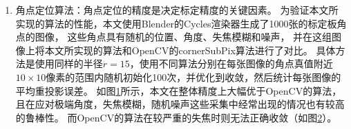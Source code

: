 \begin{enumerate}
\begin{figure}
    \centering
    {corner_fit.pgf}
    \small
    (a) 不同标定板角度下的精度对比\hfill
    (b) 不同失焦模糊下的精度对比\hfill
    (c) 不同噪音下的精度对比
    \caption[OpenCV与本文使用的角点定位算法的精度对比]{
        OpenCV与本文使用的角点定位算法的精度对比。
        带有噪音的图像服从柏松分布，
        增益表示在传感器取得最大读数时接收的电子数量，增益越高，噪声越小。
        在Blender渲染的全部1000张图像中，
        (a)展示了增益$2^{14}$时距离焦平面-0.3至0.2米的图像中，误差与标定版角度的关系；
        (b)展示了增益$2^{14}$时倾斜角度70°以下的图像中，误差与失焦模糊程度的关系；
        (c)展示了距离焦平面-0.3至0.2米且倾斜角度70°以下的图像中，误差与噪音强度的关系。
    }
    \label{fig:corner_fit}
\end{figure}

\begin{figure}
    \centering
    \begin{subfigure}{1.57in}
        {corner_gain-14_0023_opencv.pgf}%
        \caption{OpenCV, 增益$2^{14}$}%
    \end{subfigure}%
    \begin{subfigure}{1.57in}
        {corner_gain-10_0023_opencv.pgf}%
        \caption{OpenCV, 增益$2^{10}$}%
    \end{subfigure}%
    \begin{subfigure}{1.57in}
        {corner_gain-14_0023_saddle.pgf}%
        \caption{本文, 增益$2^{14}$}%
    \end{subfigure}%
    \begin{subfigure}{1.57in}
        {corner_gain-10_0023_saddle.pgf}%
        \caption{本文, 增益$2^{10}$}%
    \end{subfigure}%
    \caption[较严重失焦时的角点定位结果]{
        较严重失焦时的角点定位结果。
        左边两幅图展示了OpenCV的cornerSubPix算法在不同噪音强度时的结果，
        右边两幅图展示了本文所实现的算法的结果。
        图中的红色圆点表示100次随机初始化的收敛位置，
        绿色点表示角点位置真值。
        可见OpenCV无法正确收敛，在相同的半径参数下，本文所实现的算法可处理更大的失焦程度。
    }
    \label{fig:corner_blur}
\end{figure}

\item 角点定位算法：角点定位的精度是决定标定精度的关键因素。
为验证本文所实现的算法的性能，本文使用Blender的Cycles渲染器生成了1000张的标定板角点的图像，
这些角点具有随机的位置、角度、失焦模糊和噪声，
并在这组图像上将本文所实现的算法和OpenCV的cornerSubPix算法进行了对比。
具体方法是使用同样的半径$r=15$，使用不同算法分别在每张图像的角点真值附近$10\times 10$像素的范围内随机初始化100次，并优化到收敛，然后统计每张图像的平均重投影误差。
如图\ref{fig:corner_fit}所示，本文在整体精度上大幅优于OpenCV的算法，且在应对极端角度，失焦模糊，随机噪声这些采集中经常出现的情况也有较高的鲁棒性。
而OpenCV的算法在较严重的失焦时则无法正确收敛（如图\ref{fig:corner_blur}）。


\end{enumerate}
